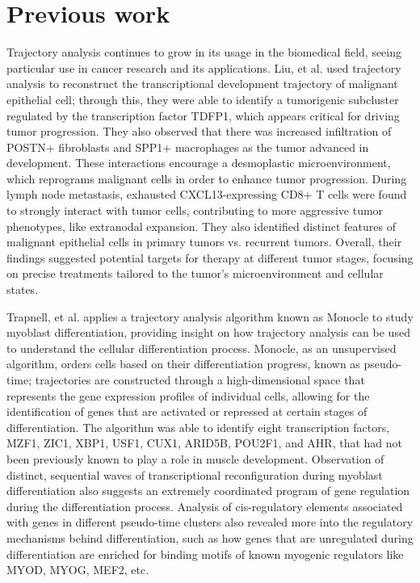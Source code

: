\documentclass{article}
\begin{document}
\section{Previous work}
Trajectory analysis continues to grow in its usage in the biomedical field, seeing particular use in cancer research and its applications. Liu, et al. used trajectory analysis to reconstruct the transcriptional development trajectory of malignant epithelial cell; through this, they were able to identify a tumorigenic subcluster regulated by the transcription factor TDFP1, which appears critical for driving tumor progression. They also observed that there was increased infiltration of POSTN+ fibroblasts and SPP1+ macrophages as the tumor advanced in development. These interactions encourage a desmoplastic microenvironment, which reprograms malignant cells in order to enhance tumor progression. During lymph node metastasis, exhausted CXCL13-expressing CD8+ T cells were found to strongly interact with tumor cells, contributing to more aggressive tumor phenotypes, like extranodal expansion. They also identified distinct features of malignant epithelial cells in primary tumors vs. recurrent tumors. Overall, their findings suggested potential targets for therapy at different tumor stages, focusing on precise treatments tailored to the tumor’s microenvironment and cellular states. 

Trapnell, et al. applies a trajectory analysis algorithm known as Monocle to study myoblast differentiation, providing insight on how trajectory analysis can be used to understand the cellular differentiation process. Monocle, as an unsupervised algorithm, orders cells based on their differentiation progress, known as pseudo-time; trajectories are constructed through a high-dimensional space that represents the gene expression profiles of individual cells, allowing for the identification of genes that are activated or repressed at certain stages of differentiation. The algorithm was able to identify eight transcription factors, MZF1, ZIC1, XBP1, USF1, CUX1, ARID5B, POU2F1, and AHR, that had not been previously known to play a role in muscle development. Observation of distinct, sequential waves of transcriptional reconfiguration during myoblast differentiation also suggests an extremely coordinated program of gene regulation during the differentiation process. Analysis of cis-regulatory elements associated with genes in different pseudo-time clusters also revealed more into the regulatory mechanisms behind differentiation, such as how genes that are unregulated during differentiation are enriched for binding motifs of known myogenic regulators like MYOD, MYOG, MEF2, etc.
\end{document}
